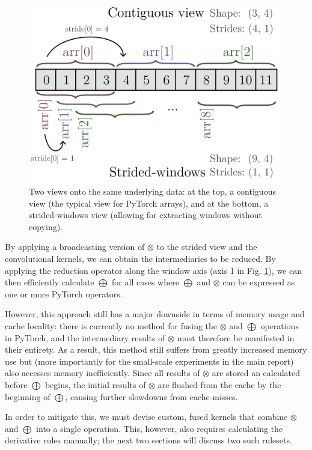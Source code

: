 \documentclass[a4paper, 12pt]{report}
\begin{document}
\begin{figure}[ht!]
	\center
  \includegraphics[width=1\textwidth]{extension-figures/strides.png}
  \caption{Two views onto the same underlying data: at the top, a contiguous view (the typical view for PyTorch arrays), and at the bottom, a strided-windows view (allowing for extracting windows without copying). }
  \label{fig:strides}
\end{figure}

\noindent
By applying a broadcasting version of $\otimes$ to the strided view and the convolutional kernels, we can obtain the intermediaries to be reduced.
By applying the reduction operator along the window axis (axis 1 in Fig. \ref{fig:strides}), we can then efficiently calculate $\bigoplus$ for all cases where $\bigoplus$ and $\otimes$ can be expressed as one or more PyTorch operators.

However, this approach still has a major downside in terms of memory usage and cache locality: there is currently no method for fusing the $\otimes$ and $\bigoplus$ operations in PyTorch, and the intermediary results of $\otimes$ must therefore be manifested in their entirety. As a result, this method still suffers from greatly increased memory use but  (more importantly for the small-scale experiments in the main report) also accesses memory inefficiently. Since all results of $\otimes$ are stored an calculated before $\bigoplus$ begins, the initial results of $\otimes$ are flushed from the cache by the beginning of $\bigoplus$, causing further slowdowns from cache-misses.

In order to mitigate this, we must devise custom, fused kernels that combine $\otimes$ and $\bigoplus$ into a single operation. This, however, also requires calculating the derivative rules manually; the next two sections will discuss two such rulesets.
\end{document}
